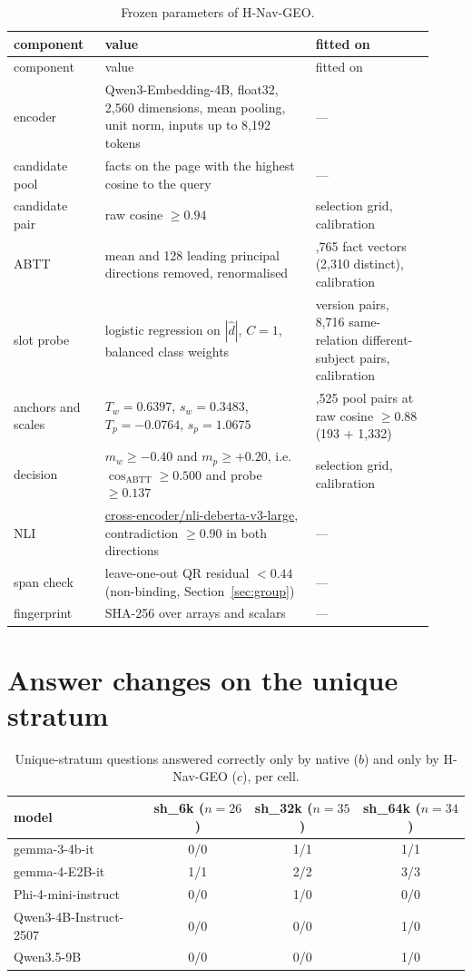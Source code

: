 \documentclass[journal=jcisd8,manuscript=article]{achemso}
\newcommand{\code}[1]{\texttt{\detokenize{#1}}}          %
\newcommand{\sub}[1]{\textsf{sh\_#1}}                    %
\newcommand{\geo}{H-Nav-GEO}
\begin{document}
\begin{longtable}{>{\raggedright\arraybackslash}p{0.20\linewidth}>{\raggedright\arraybackslash}p{0.46\linewidth}>{\raggedright\arraybackslash}p{0.26\linewidth}}
\caption{Frozen parameters of \geo{}.}\label{tab:frozen}\\
\toprule component & value & fitted on\\\midrule\endfirsthead
\toprule component & value & fitted on\\\midrule\endhead
encoder & Qwen3-Embedding-4B, float32, 2,560 dimensions, mean pooling, unit norm, inputs up to 8,192 tokens & ---\\
candidate pool & 50 facts on the page with the highest cosine to the query & ---\\
candidate pair & raw cosine $\ge0.94$ & selection grid, calibration\\
ABTT & mean and 128 leading principal directions removed, renormalised & 2,765 fact vectors (2,310 distinct), calibration\\
slot probe & logistic regression on $|\hat d|$, $C=1$, balanced class weights & 989 version pairs, 8,716 same-relation different-subject pairs, calibration\\
anchors and scales & $T_w=0.6397$, $s_w=0.3483$, $T_p=-0.0764$, $s_p=1.0675$ & 1,525 pool pairs at raw cosine $\ge0.88$ (193 + 1,332)\\
decision & $m_w\ge-0.40$ and $m_p\ge+0.20$, i.e.\ $\cos_{\mathrm{ABTT}}\ge0.500$ and probe $\ge0.137$ & selection grid, calibration\\
NLI & \url{cross-encoder/nli-deberta-v3-large}, contradiction $\ge0.90$ in both directions & ---\\
span check & leave-one-out QR residual $<0.44$ (non-binding, Section~\ref{sec:group}) & ---\\
fingerprint & SHA-256 \code{335b4540...} over arrays and scalars & ---\\\bottomrule
\end{longtable}

\section{Answer changes on the unique stratum}
\label{app:flips}

\begin{table}[H]\centering\small
\caption{Unique-stratum questions answered correctly only by native ($b$) and only by \geo{} ($c$), per cell.}
\label{tab:flips}
\begin{tabular}{lccc}\toprule
model & \sub{6k} ($n=26$) & \sub{32k} ($n=35$) & \sub{64k} ($n=34$)\\\midrule
gemma-3-4b-it          & 0/0 & 1/1 & 1/1\\
gemma-4-E2B-it         & 1/1 & 2/2 & 3/3\\
Phi-4-mini-instruct    & 0/0 & 1/0 & 0/0\\
Qwen3-4B-Instruct-2507 & 0/0 & 0/0 & 1/0\\
Qwen3.5-9B             & 0/0 & 0/0 & 1/0\\\bottomrule
\end{tabular}\end{table}
\end{document}
